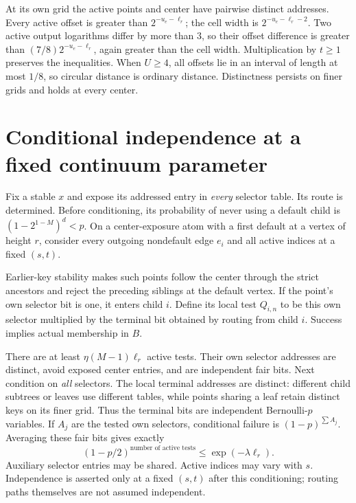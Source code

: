 \documentclass[11pt,letterpaper]{article}
\begin{document}
At its own grid the active points and center have pairwise distinct addresses.
Every active offset is greater than $2^{-u_e-\ell_r}$; the cell width is
$2^{-u_e-\ell_r-2}$. Two active output logarithms differ by more than $3$,
so their offset difference is greater than
$(7/8)2^{-u_e-\ell_r}$, again greater than the cell width. Multiplication by
$t\ge1$ preserves the inequalities. When $U\ge4$, all offsets lie in an
interval of length at most $1/8$, so circular distance is ordinary distance.
Distinctness persists on finer grids and holds at every center.

\section{Conditional independence at a fixed continuum parameter}
Fix a stable $x$ and expose its addressed entry in \emph{every} selector table.
Its route is determined. Before conditioning, its probability of never using
a default child is $(1-2^{1-M})^d<p$. On a center-exposure atom with a first
default at a vertex of height $r$, consider every outgoing nondefault edge
$e_i$ and all active indices at a fixed $(s,t)$.

Earlier-key stability makes such points follow the center through the strict
ancestors and reject the preceding siblings at the default vertex. If the
point's own selector bit is one, it enters child $i$. Define its local test
$Q_{i,n}$ to be this own selector multiplied by the terminal bit obtained by
routing from child $i$. Success implies actual membership in $B$.

There are at least $\eta(M-1)\ell_r$ active tests. Their own selector addresses
are distinct, avoid exposed center entries, and are independent fair bits.
Next condition on \emph{all} selectors. The local terminal addresses are
distinct: different child subtrees or leaves use different tables, while points
sharing a leaf retain distinct keys on its finer grid. Thus the terminal bits
are independent Bernoulli-$p$ variables. If $A_j$ are the tested own selectors,
conditional failure is $(1-p)^{\sum A_j}$. Averaging these fair bits gives
exactly
\[
 (1-p/2)^{\text{number of active tests}}
 \le \exp(-\lambda\ell_r).
\]
Auxiliary selector entries may be shared. Active indices may vary with $s$.
Independence is asserted only at a fixed $(s,t)$ after this conditioning;
routing paths themselves are not assumed independent.
\end{document}
